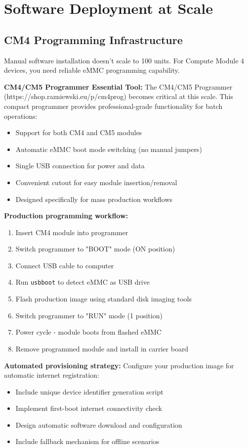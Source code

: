 \section{Software Deployment at Scale}

\subsection{CM4 Programming Infrastructure}

Manual software installation doesn't scale to 100 units. For Compute Module 4 devices, you need reliable eMMC programming capability.

\textbf{CM4/CM5 Programmer Essential Tool:}
The CM4/CM5 Programmer (https://shop.razniewski.eu/p/cm4prog) becomes critical at this scale. This compact programmer provides professional-grade functionality for batch operations:

\begin{itemize}
\item Support for both CM4 and CM5 modules
\item Automatic eMMC boot mode switching (no manual jumpers)
\item Single USB connection for power and data
\item Convenient cutout for easy module insertion/removal
\item Designed specifically for mass production workflows
\end{itemize}

\textbf{Production programming workflow:}
\begin{enumerate}
\item Insert CM4 module into programmer
\item Switch programmer to "BOOT" mode (ON position)
\item Connect USB cable to computer
\item Run \texttt{usbboot} to detect eMMC as USB drive
\item Flash production image using standard disk imaging tools
\item Switch programmer to "RUN" mode (1 position)
\item Power cycle - module boots from flashed eMMC
\item Remove programmed module and install in carrier board
\end{enumerate}

\textbf{Automated provisioning strategy:}
Configure your production image for automatic internet registration:
\begin{itemize}
\item Include unique device identifier generation script
\item Implement first-boot internet connectivity check
\item Design automatic software download and configuration
\item Include fallback mechanism for offline scenarios
\end{itemize}

